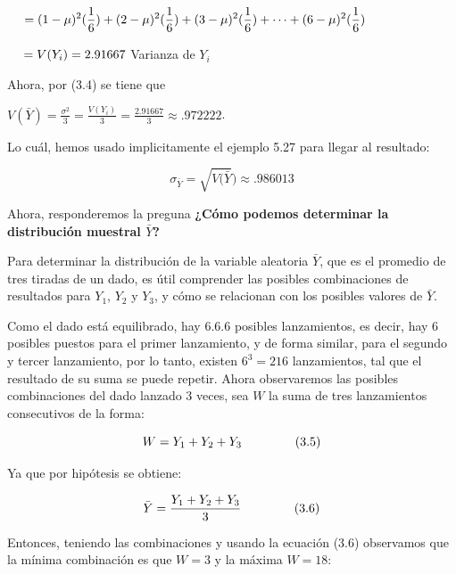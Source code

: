 \documentclass[
]{article}
\begin{document}
\begin{itemize}
  $\hspace{0.45cm} = \displaystyle  (1-\mu)^2(\frac{1}{6}) +  (2-\mu)^2(\frac{1}{6}) + (3-\mu)^2(\frac{1}{6}) + \cdots +  (6-\mu)^2(\frac{1}{6})$ 
  
  $\hspace{0.45cm} \displaystyle = V(Y_{i}) = 2.91667 $ Varianza de $Y_{i}$
  
  Ahora, por (3.4) se tiene que
  
  $\displaystyle V(\bar{Y}) = \frac{\sigma^{2}}{3} = \frac{V(Y_i)}{3} = \frac{2.91667}{3} \approx .972222$.
  
  Lo cuál, hemos usado implicitamente el ejemplo 5.27 para llegar al resultado: 
  
  $$\sigma_{\bar{Y}} = \sqrt{V(\bar{Y}}) \approx .986013 $$
  
  
  
\end{itemize}



Ahora, responderemos la preguna \textbf{¿Cómo podemos determinar la distribución muestral $\bar{Y}$?}

Para determinar la distribución de la variable aleatoria $\bar{Y}$, que es el promedio de tres tiradas de un dado, es útil comprender las posibles combinaciones de resultados para $Y_{1}$, $Y_{2}$ y $Y_{3}$, y cómo se relacionan con los posibles valores de $\bar{Y}$.

Como el dado está equilibrado, hay $6.6.6$ posibles lanzamientos, es decir, hay 6 posibles puestos para el primer lanzamiento, y de forma similar, para el segundo y tercer lanzamiento, por lo tanto, existen $6^3=216$ lanzamientos, tal que el resultado de su suma se puede repetir. Ahora observaremos las posibles combinaciones del dado lanzado 3 veces, sea $W$ la suma de tres lanzamientos consecutivos de la forma:

$$W = Y_{1} + Y_{2} + Y_{3} \hspace{1.5cm} (3.5)$$

Ya que por hipótesis se obtiene:

$$\bar{Y} = \frac{Y_{1} + Y_{2} + Y_{3}}{3} \hspace{1.5cm} (3.6)$$


Entonces, teniendo las combinaciones y usando la ecuación (3.6) observamos que la mínima combinación es que $W = 3$ y la máxima $W = 18$: 
\end{document}
